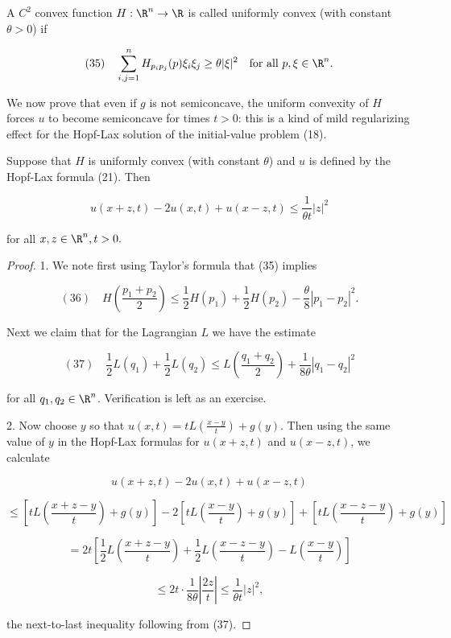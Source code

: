\begin{definition}
\label{def:uniformly-convex-hamiltonian}
A $C^2$ convex function $H : \R^n \to \R$ is called uniformly convex (with constant $\theta > 0$) if

$$(35) \quad \sum_{i,j=1}^{n} H_{p_i p_j}(p)\xi_i \xi_j \geq \theta|\xi|^2 \quad \text{for all } p,\xi \in \R^n.$$
\end{definition}

We now prove that even if $g$ is not semiconcave, the uniform convexity of $H$ forces $u$ to become semiconcave for times $t > 0$: this is a kind of mild regularizing effect for the Hopf-Lax solution of the initial-value problem (18).

\begin{lemma}
\label{lem:hopf-lax-semiconcavity-uniform-convexity}
Suppose that $H$ is uniformly convex (with constant $\theta$) and $u$ is defined by the Hopf-Lax formula (21). Then

$$u(x+z,t) - 2u(x,t) + u(x-z,t) \leq \frac{1}{\theta t}|z|^2$$

for all $x, z \in \R^n, t > 0.$
\end{lemma}

\begin{proof}
1. We note first using Taylor's formula that (35) implies

$$(36) \quad H\left(\frac{p_1 + p_2}{2}\right) \leq \frac{1}{2}H(p_1) + \frac{1}{2}H(p_2) - \frac{\theta}{8}|p_1 - p_2|^2.$$

Next we claim that for the Lagrangian $L$ we have the estimate

$$(37) \quad \frac{1}{2}L(q_1) + \frac{1}{2}L(q_2) \leq L\left(\frac{q_1+q_2}{2}\right) + \frac{1}{8\theta}|q_1 - q_2|^2$$

for all $q_1, q_2 \in \R^n$. Verification is left as an exercise.

2. Now choose $y$ so that $u(x,t) = tL\left(\frac{x-y}{t}\right) + g(y)$. Then using the same value of $y$ in the Hopf-Lax formulas for $u(x+z,t)$ and $u(x-z,t)$, we calculate

$$u(x+z,t) - 2u(x,t) + u(x-z,t)$$

$$\leq \left[tL\left(\frac{x+z-y}{t}\right) + g(y)\right] - 2\left[tL\left(\frac{x-y}{t}\right) + g(y)\right] + \left[tL\left(\frac{x-z-y}{t}\right) + g(y)\right]$$

$$= 2t\left[\frac{1}{2}L\left(\frac{x+z-y}{t}\right) + \frac{1}{2}L\left(\frac{x-z-y}{t}\right) - L\left(\frac{x-y}{t}\right)\right]$$

$$\leq 2t \cdot \frac{1}{8\theta}\left|\frac{2z}{t}\right| \leq \frac{1}{\theta t}|z|^2,$$

the next-to-last inequality following from (37).
\end{proof}

